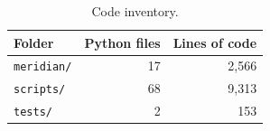 \begin{table}[!htbp]
\centering
\small
\caption{Code inventory.}
\label{tab:inventory}
\begin{tabularx}{\linewidth}{Xrr}
\toprule
\textbf{Folder} & \textbf{Python files} & \textbf{Lines of code} \\
\midrule
\texttt{meridian/} & 17 & 2,566 \\
\texttt{scripts/} & 68 & 9,313 \\
\texttt{tests/} & 2 & 153 \\
\bottomrule
\end{tabularx}
\end{table}
